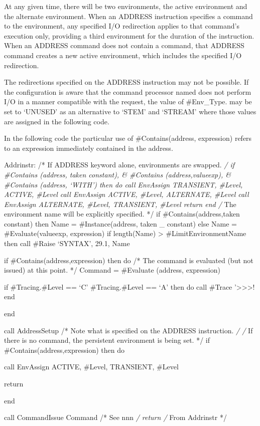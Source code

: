 At any given time, there will be two environments, the active
environment and the alternate environment. When an ADDRESS instruction
specifies a command to the environment, any specified I/O redirection
applies to that command's execution only, providing a third environment
for the duration of the instruction. When an ADDRESS command does not
contain a command, that ADDRESS command creates a new active
environment, which includes the specified I/O redirection.

The redirections specified on the ADDRESS instruction may not be
possible. If the configuration is aware that the command processor named
does not perform I/O in a manner compatible with the request, the value
of \#Env\_Type. may be set to `UNUSED' as an alternative to `STEM' and
`STREAM' where those values are assigned in the following code.

In the following code the particular use of \#Contains(address,
expression) refers to an expression immediately contained in the
address.

Addrinstr: /* If ADDRESS keyword alone, environments are swapped.
\emph{/ if \#Contains (address, taken constant), \& \#Contains
(address,valueexp), \& \#Contains (address, `WITH') then do call
EnvAssign TRANSIENT, \#Level, ACTIVE, \#Level call EnvAssign ACTIVE,
\#Level, ALTERNATE, \#Level call EnvAssign ALTERNATE, \#Level,
TRANSIENT, \#Level return end /} The environment name will be explicitly
specified. */ if \#Contains(address,taken constant) then Name =
\#Instance(address, taken \_ constant) else Name = \#Evaluate(valueexp,
expression) if length(Name) \textgreater{} \#LimitEnvironmentName then
call \#Raise `SYNTAX', 29.1, Name

if \#Contains(address,expression) then do /* The command is evaluated
(but not issued) at this point. */ Command = \#Evaluate (address,
expression)

if \#Tracing.\#Level == `C' \textbar{} \#Tracing.\#Level == `A' then do
call \#Trace '\textgreater\textgreater\textgreater! end

end

call AddressSetup /* Note what is specified on the ADDRESS instruction.
\emph{/ /} If there is no command, the persistent environment is being
set. */ if \#Contains(address,expression) then do

call EnvAssign ACTIVE, \#Level, TRANSIENT, \#Level

return

end

call CommandIssue Command /* See nnn \emph{/ return /} From Addrinstr */

